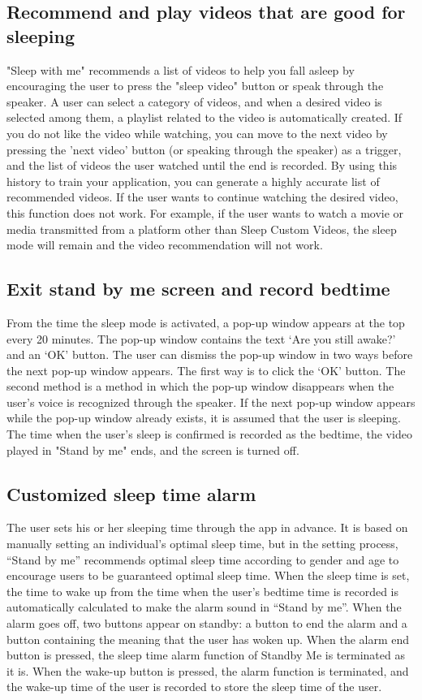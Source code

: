 \documentclass[conference]{IEEEtran}
\begin{document}
\subsection{Recommend and play videos that are good for sleeping}
"Sleep with me" recommends a list of videos to help you fall asleep by encouraging the user to press the "sleep video" button or speak through the speaker. A user can select a category of videos, and when a desired video is selected among them, a playlist related to the video is automatically created. If you do not like the video while watching, you can move to the next video by pressing the 'next video' button (or speaking through the speaker) as a trigger, and the list of videos the user watched until the end is recorded. By using this history to train your application, you can generate a highly accurate list of recommended videos. If the user wants to continue watching the desired video, this function does not work. For example, if the user wants to watch a movie or media transmitted from a platform other than Sleep Custom Videos, the sleep mode will remain and the video recommendation will not work.
\vspace{1\baselineskip}
\subsection{Exit stand by me screen and record bedtime}
From the time the sleep mode is activated, a pop-up window appears at the top every 20 minutes. The pop-up window contains the text ‘Are you still awake?’ and an ‘OK’ button. The user can dismiss the pop-up window in two ways before the next pop-up window appears. The first way is to click the ‘OK’ button. The second method is a method in which the pop-up window disappears when the user's voice is recognized through the speaker. If the next pop-up window appears while the pop-up window already exists, it is assumed that the user is sleeping. The time when the user's sleep is confirmed is recorded as the bedtime, the video played in "Stand by me" ends, and the screen is turned off.
\vspace{1\baselineskip}
\subsection{Customized sleep time alarm}
The user sets his or her sleeping time through the app in advance. It is based on manually setting an individual's optimal sleep time, but in the setting process, “Stand by me” recommends optimal sleep time according to gender and age to encourage users to be guaranteed optimal sleep time. When the sleep time is set, the time to wake up from the time when the user's bedtime time is recorded is automatically calculated to make the alarm sound in “Stand by me”. When the alarm goes off, two buttons appear on standby: a button to end the alarm and a button containing the meaning that the user has woken up. When the alarm end button is pressed, the sleep time alarm function of Standby Me is terminated as it is. When the wake-up button is pressed, the alarm function is terminated, and the wake-up time of the user is recorded to store the sleep time of the user.
\vspace{1\baselineskip}
\end{document}
